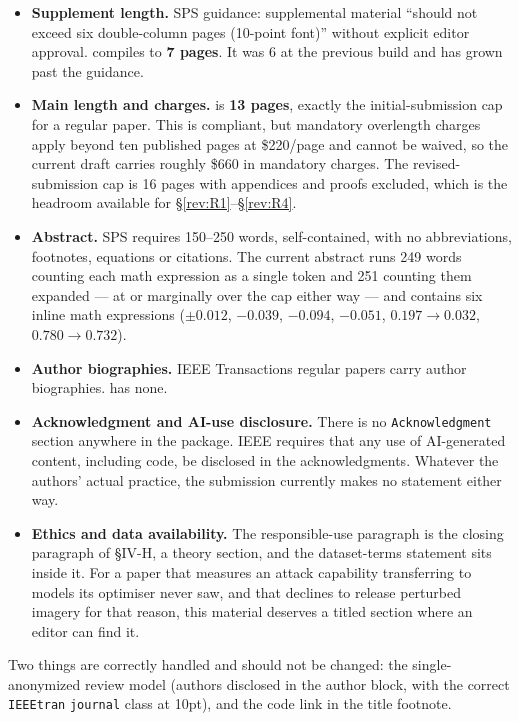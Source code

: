 \documentclass[11pt,a4paper]{article}
\newcommand{\file}[1]{\path{#1}}
\begin{document}
\begin{itemize}
\item \textbf{Supplement length.} SPS guidance: supplemental material ``should
  not exceed six double-column pages (10-point font)'' without explicit editor
  approval. \file{supplementary.pdf} compiles to \textbf{7 pages}. It was 6 at
  the previous build and has grown past the guidance.
\item \textbf{Main length and charges.} \file{main.pdf} is \textbf{13 pages},
  exactly the initial-submission cap for a regular paper. This is compliant,
  but mandatory overlength charges apply beyond ten published pages at
  \$220/page and cannot be waived, so the current draft carries roughly \$660
  in mandatory charges. The revised-submission cap is 16 pages with appendices
  and proofs excluded, which is the headroom available for
  \S\ref{rev:R1}--\S\ref{rev:R4}.
\item \textbf{Abstract.} SPS requires 150--250 words, self-contained, with no
  abbreviations, footnotes, equations or citations. The current abstract runs
  249 words counting each math expression as a single token and 251 counting
  them expanded --- at or marginally over the cap either way --- and contains six
  inline math expressions ($\pm0.012$, $-0.039$, $-0.094$, $-0.051$,
  $0.197\to0.032$, $0.780\to0.732$).
\item \textbf{Author biographies.} IEEE Transactions regular papers carry
  author biographies. \file{main.tex} has none.
\item \textbf{Acknowledgment and AI-use disclosure.} There is no
  \texttt{Acknowledgment} section anywhere in the package. IEEE requires that
  any use of AI-generated content, including code, be disclosed in the
  acknowledgments. Whatever the authors' actual practice, the submission
  currently makes no statement either way.
\item \textbf{Ethics and data availability.} The responsible-use paragraph is
  the closing paragraph of \S IV-H, a theory section, and the dataset-terms
  statement sits inside it. For a paper that measures an attack capability
  transferring to models its optimiser never saw, and that declines to release
  perturbed imagery for that reason, this material deserves a titled section
  where an editor can find it.
\end{itemize}

Two things are correctly handled and should not be changed: the single-anonymized
review model (authors disclosed in the author block, with the correct
\texttt{IEEEtran} \texttt{journal} class at 10pt), and the code link in the
title footnote.
\end{document}
